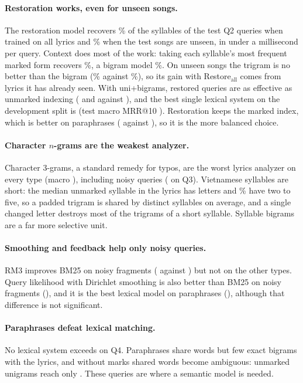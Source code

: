 \documentclass[11pt]{article}
\makeatletter
\newcommand{\Qtwo}{Q2\xspace}
\newcommand{\Qthree}{Q3\xspace}
\newcommand{\Qfour}{Q4\xspace}
\newcommand{\mrr}{MRR@10\xspace}
\makeatother
\begin{document}
\paragraph{Restoration works, even for unseen songs.} The restoration model recovers \RestoreAccAll\% of the
syllables of the test \Qtwo{} queries when trained on all lyrics and \RestoreAccTrain\% when the test songs
are unseen, in under a millisecond per query. Context does most of the work: taking each syllable's most
frequent marked form recovers \RestoreOrderAllOne\%, a bigram model \RestoreOrderAllTwo\%. On unseen songs
the trigram is no better than the bigram (\RestoreOrderTrainThree\% against \RestoreOrderTrainTwo\%), so
its gain with Restore$_{\mathrm{all}}$ comes from lyrics it has already seen. With uni+bigrams, restored queries are as effective as
unmarked indexing (\MRestAllBiTwo{} and \MRestTrainBiTwo{} against \MNodiacBiTwo), and the best single
lexical system on the development split is \BestSingleLexDev{} (test macro \mrr{} \BestSingleLexMacro).
Restoration keeps the marked index, which is better on paraphrases (\MRestAllBiFour{} against
\MNodiacBiFour), so it is the more balanced choice.

\paragraph{Character $n$-grams are the weakest analyzer.} Character 3-grams, a standard remedy for typos,
are the worst lyrics analyzer on every type (macro \MCharMacro), including noisy queries (\MCharThree{} on
\Qthree). Vietnamese syllables are short: the median unmarked syllable in the lyrics has \SylLettersMedian{}
letters and \SylShareTwoFive\% have two to five, so a padded trigram is shared by \TypesPerTrigram{} distinct
syllables on average, and a single changed letter destroys most of the trigrams of a short syllable.
Syllable bigrams are a far more selective unit.

\paragraph{Smoothing and feedback help only noisy queries.} RM3 improves BM25 on noisy fragments
(\MRMthreeThree{} against \MSylThree) but not on the other types. Query likelihood with Dirichlet smoothing
is also better than BM25 on noisy fragments (\MQLThree), and it is the best lexical model on paraphrases
(\MQLFour), although that difference is not significant.

\paragraph{Paraphrases defeat lexical matching.} No lexical system exceeds \BestLexQfour{} on \Qfour.
Paraphrases share words but few exact bigrams with the lyrics, and without marks shared words become
ambiguous: unmarked unigrams reach only \MNodiacFour. These queries are where a semantic model is needed.
\end{document}
